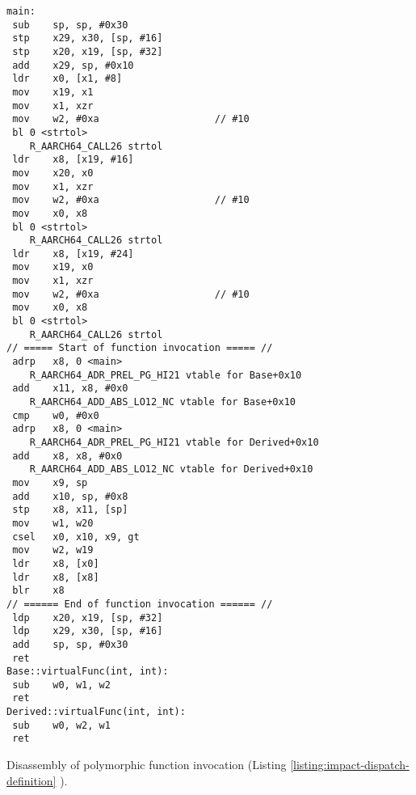 \vspace{2em}
\begin{code}
    \begin{verbatim}
main:
 sub	sp, sp, #0x30
 stp	x29, x30, [sp, #16]
 stp	x20, x19, [sp, #32]
 add	x29, sp, #0x10
 ldr	x0, [x1, #8]
 mov	x19, x1
 mov	x1, xzr
 mov	w2, #0xa                   	// #10
 bl	0 <strtol>
    R_AARCH64_CALL26 strtol
 ldr	x8, [x19, #16]
 mov	x20, x0
 mov	x1, xzr
 mov	w2, #0xa                   	// #10
 mov	x0, x8
 bl	0 <strtol>
    R_AARCH64_CALL26 strtol
 ldr	x8, [x19, #24]
 mov	x19, x0
 mov	x1, xzr
 mov	w2, #0xa                   	// #10
 mov	x0, x8
 bl	0 <strtol>
    R_AARCH64_CALL26 strtol
// ===== Start of function invocation ===== //
 adrp	x8, 0 <main>
    R_AARCH64_ADR_PREL_PG_HI21 vtable for Base+0x10
 add	x11, x8, #0x0
    R_AARCH64_ADD_ABS_LO12_NC vtable for Base+0x10
 cmp	w0, #0x0
 adrp	x8, 0 <main>
    R_AARCH64_ADR_PREL_PG_HI21 vtable for Derived+0x10
 add	x8, x8, #0x0
    R_AARCH64_ADD_ABS_LO12_NC vtable for Derived+0x10
 mov	x9, sp
 add	x10, sp, #0x8
 stp	x8, x11, [sp]
 mov	w1, w20
 csel	x0, x10, x9, gt
 mov	w2, w19
 ldr	x8, [x0]
 ldr	x8, [x8]
 blr	x8
// ====== End of function invocation ====== //
 ldp	x20, x19, [sp, #32]
 ldp	x29, x30, [sp, #16]
 add	sp, sp, #0x30
 ret
Base::virtualFunc(int, int):
 sub	w0, w1, w2
 ret
Derived::virtualFunc(int, int):
 sub	w0, w2, w1
 ret
    \end{verbatim}
    \caption{Disassembly of polymorphic function invocation (Listing \ref{listing:impact-dispatch-definition} ).}
    \label{listing:impact-dispatch-polymorphic-disassembly}
\end{code}



